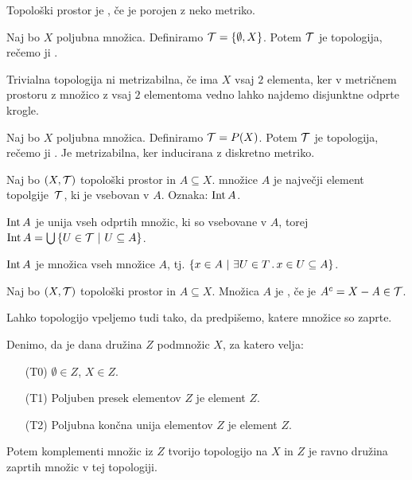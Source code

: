 \begin{definicija}
    Topološki prostor je , če je porojen z neko metriko.
\end{definicija}

\begin{primer}
    Naj bo $X$ poljubna množica. Definiramo $\mathcal{T} = \left\{\emptyset, X\right\}$. Potem $\mathcal{T}$ je topologija, rečemo ji .

    Trivialna topologija ni metrizabilna, če ima $X$ vsaj $2$ elementa, ker v metričnem prostoru z množico z vsaj $2$ elementoma vedno lahko najdemo disjunktne odprte krogle.
\end{primer}

\begin{primer}
    Naj bo $X$ poljubna množica. Definiramo $\mathcal{T} = P(X)$. Potem $\mathcal{T}$ je topologija, rečemo ji .
    Je metrizabilna, ker inducirana z diskretno metriko.
\end{primer}

\begin{definicija}
    Naj bo $(X, \mathcal{T})$ topološki prostor in $A \subseteq X$.  množice $A$ je največji element topolgije~$\mathcal{T}$, ki je vsebovan v $A$. Oznaka: $\operatorname{Int} A$.
\end{definicija}

\begin{trditev}
    $\operatorname{Int} A$ je unija vseh odprtih množic, ki so vsebovane v $A$, torej $\operatorname{Int} A = \bigcup \left\{U \in \mathcal{T} \ | \ U \subseteq A\right\}$.
\end{trditev}

\begin{trditev}
    $\operatorname{Int} A$ je množica vseh  množice $A$, tj. $\left\{x \in A \ | \ \exists U \in T \,.\, x \in U \subseteq A\right\}$.
\end{trditev}

\begin{definicija}
    Naj bo $(X, \mathcal{T})$ topološki prostor in $A \subseteq X$. Množica $A$ je , če je $A^c = X - A \in \mathcal{T}$.
\end{definicija}

\begin{opomba}
    Lahko topologijo vpeljemo tudi tako, da predpišemo, katere množice so zaprte.

    Denimo, da je dana družina $Z$ podmnožic $X$, za katero velja:
    \begin{enumerate}
        \item[(T0)] $\emptyset \in Z$, $X \in Z$.
        \item[(T1)] Poljuben presek elementov $Z$ je element $Z$.
        \item[(T2)] Poljubna končna unija elementov $Z$ je element $Z$.
    \end{enumerate}
    Potem komplementi množic iz $Z$ tvorijo topologijo na $X$ in $Z$ je ravno družina zaprtih množic v tej topologiji.
\end{opomba}

